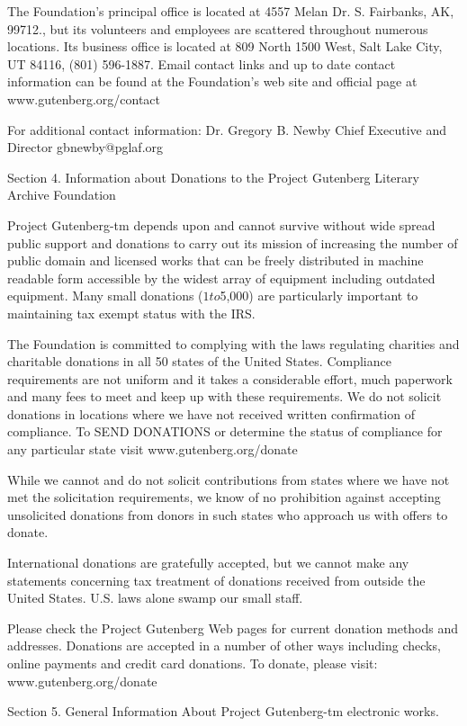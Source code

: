 \begin{PGtext}
The Foundation's principal office is located at 4557 Melan Dr. S.
Fairbanks, AK, 99712., but its volunteers and employees are scattered
throughout numerous locations.  Its business office is located at 809
North 1500 West, Salt Lake City, UT 84116, (801) 596-1887.  Email
contact links and up to date contact information can be found at the
Foundation's web site and official page at www.gutenberg.org/contact

For additional contact information:
     Dr. Gregory B. Newby
     Chief Executive and Director
     gbnewby@pglaf.org

Section 4.  Information about Donations to the Project Gutenberg
Literary Archive Foundation

Project Gutenberg-tm depends upon and cannot survive without wide
spread public support and donations to carry out its mission of
increasing the number of public domain and licensed works that can be
freely distributed in machine readable form accessible by the widest
array of equipment including outdated equipment.  Many small donations
($1 to $5,000) are particularly important to maintaining tax exempt
status with the IRS.

The Foundation is committed to complying with the laws regulating
charities and charitable donations in all 50 states of the United
States.  Compliance requirements are not uniform and it takes a
considerable effort, much paperwork and many fees to meet and keep up
with these requirements.  We do not solicit donations in locations
where we have not received written confirmation of compliance.  To
SEND DONATIONS or determine the status of compliance for any
particular state visit www.gutenberg.org/donate

While we cannot and do not solicit contributions from states where we
have not met the solicitation requirements, we know of no prohibition
against accepting unsolicited donations from donors in such states who
approach us with offers to donate.

International donations are gratefully accepted, but we cannot make
any statements concerning tax treatment of donations received from
outside the United States.  U.S. laws alone swamp our small staff.

Please check the Project Gutenberg Web pages for current donation
methods and addresses.  Donations are accepted in a number of other
ways including checks, online payments and credit card donations.
To donate, please visit:  www.gutenberg.org/donate


Section 5.  General Information About Project Gutenberg-tm electronic
works.


\end{PGtext}
